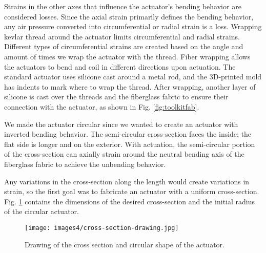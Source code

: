 Strains in the other axes that influence the actuator's bending behavior are considered losses. Since the axial strain primarily defines the bending behavior, any air pressure converted into circumferential or radial strain is a loss. Wrapping kevlar thread around the actuator limits circumferential and radial strains. Different types of circumferential strains are created based on the angle and amount of times we wrap the actuator with the thread. Fiber wrapping allows the actuators to bend and coil in different directions upon actuation. The standard actuator uses silicone cast around a metal rod, and the 3D-printed mold has indents to mark where to wrap the thread. After wrapping, another layer of silicone is cast over the threads and the fiberglass fabric to ensure their connection with the actuator, as shown in Fig. \ref{fig:toolkitfab}.

We made the actuator circular since we wanted to create an actuator with inverted bending behavior. The semi-circular cross-section faces the inside; the flat side is longer and on the exterior. With actuation, the semi-circular portion of the cross-section can axially strain around the neutral bending axis of the fiberglass fabric to achieve the unbending behavior. 

Any variations in the cross-section along the length would create variations in strain, so the first goal was to fabricate an actuator with a uniform cross-section. Fig. \ref{fig:crosssection} contains the dimensions of the desired cross-section and the initial radius of the circular actuator.

\begin{figure}[ht]
    \centering
    \texttt{[image: images4/cross-section-drawing.jpg]}
    \caption{Drawing of the cross section and circular shape of the actuator.}
    \label{fig:crosssection}
\end{figure}